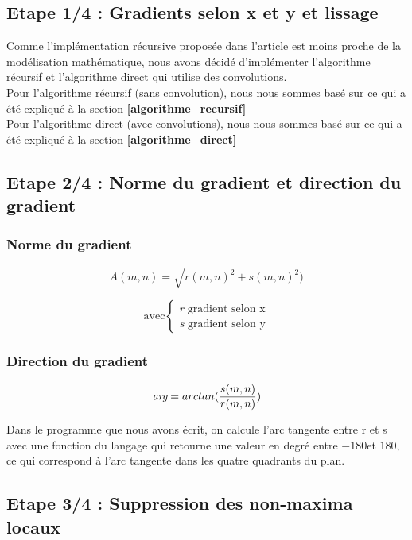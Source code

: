 \subsection{Etape 1/4 : Gradients selon x et y et lissage}

Comme l'implémentation récursive proposée dans l'article est moins proche de la modélisation mathématique, nous avons décidé d'implémenter l'algorithme récursif et l'algorithme direct qui utilise des convolutions. \\

Pour l'algorithme récursif (sans convolution), nous nous sommes basé sur ce qui a été expliqué à la section
\textbf{\ref{algorithme_recursif}} \\

Pour l'algorithme direct (avec convolutions), nous nous sommes basé sur ce qui a été expliqué à la section
\textbf{\ref{algorithme_direct}}

\subsection{Etape 2/4 : Norme du gradient et direction du gradient}
\subsubsection{Norme du gradient}

\[ A(m,n)=\sqrt{r(m,n)^2 + s(m,n)^2)} \]

\[ \text{avec} \left\{\begin{array}{ll}
r \; \text{gradient selon x} \\
s \; \text{gradient selon y}
\end{array}\right. \]

\subsubsection{Direction du gradient}

\[ \emph{arg} = arctan(\frac{s(m,n)}{r(m,n)}) \]

Dans le programme que nous avons écrit, on calcule l’arc tangente entre r et s avec une fonction du langage qui retourne une valeur en degré entre $ -180 $\degre et $ 180 $\degre, ce qui correspond à l'arc tangente dans les quatre quadrants du plan.

\subsection{Etape 3/4 : Suppression des non-maxima locaux}

